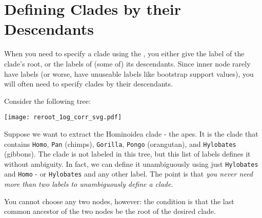 \chapter{Defining Clades by their Descendants}

When you need to specify a clade using the \nutils{}, you either give the label
of the clade's root, or the labels of (some of) its descendants. Since inner
node rarely have labels (or worse, have unuseable labels like bootstrap support
		values), you will often need to specify clades by their
descendants.

Consider the following tree:

\begin{center}
\texttt{[image: reroot\_1og\_corr\_svg.pdf]} 
\end{center}

Suppose we want to extract the Hominoidea clade - the apes. It is the clade
that contains \texttt{Homo}, \texttt{Pan} (chimps), \texttt{Gorilla},
     \texttt{Pongo} (orangutan), and \texttt{Hylobates} (gibbons). The clade is
     not labeled in this tree, but this list of labels defines it without
     ambiguity. In fact, we can define it unambiguously using just
     \texttt{Hylobates} and \texttt{Homo} - or \texttt{Hylobates} and any other
     label. The point is that \emph{you never need more than two labels to
     unambiguously define a clade}.

You cannot choose any two nodes, however: the condition is that the last
common ancestor of the two nodes be the root of the desired clade.
